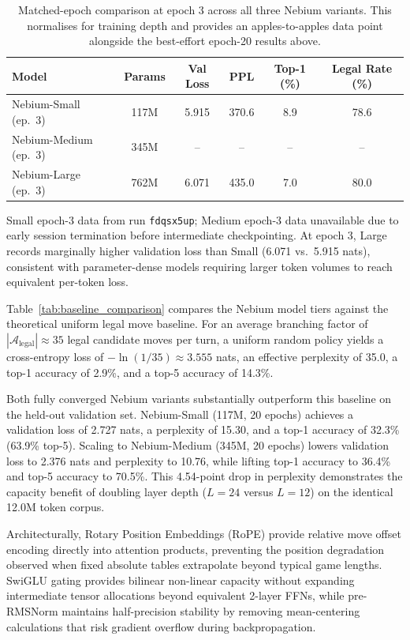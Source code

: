 \begin{table}[H]
\centering
\small
\caption[Matched-Epoch Comparison at Epoch 3]{Matched-epoch comparison at epoch 3 across all three Nebium variants. This normalises for training depth and provides an apples-to-apples data point alongside the best-effort epoch-20 results above.}
\label{tab:matched_epoch}
\begin{tabularx}{\linewidth}{>{\raggedright\arraybackslash}X c c c c c}
\toprule
\textbf{Model} & \textbf{Params} & \textbf{Val Loss} & \textbf{PPL} & \textbf{Top-1 (\%)} & \textbf{Legal Rate (\%)} \\
\midrule
Nebium-Small (ep.\ 3)  & 117M & 5.915 & 370.6 & 8.9  & 78.6 \\
Nebium-Medium (ep.\ 3) & 345M & --    & --    & --   & -- \\
Nebium-Large (ep.\ 3)  & 762M & 6.071 & 435.0 & 7.0  & 80.0 \\
\bottomrule
\end{tabularx}
\vspace{0.3em}
{\footnotesize Small epoch-3 data from run \texttt{fdqsx5up}; Medium epoch-3 data unavailable due to early session termination before intermediate checkpointing. At epoch 3, Large records marginally higher validation loss than Small (6.071 vs.\ 5.915 nats), consistent with parameter-dense models requiring larger token volumes to reach equivalent per-token loss.}
\end{table}

Table~\ref{tab:baseline_comparison} compares the Nebium model tiers against the theoretical uniform legal move baseline. For an average branching factor of $|\mathcal{A}_{\text{legal}}| \approx 35$ legal candidate moves per turn, a uniform random policy yields a cross-entropy loss of $-\ln(1/35) \approx 3.555$ nats, an effective perplexity of 35.0, a top-1 accuracy of 2.9\%, and a top-5 accuracy of 14.3\%.

Both fully converged Nebium variants substantially outperform this baseline on the held-out validation set. Nebium-Small (117M, 20 epochs) achieves a validation loss of 2.727 nats, a perplexity of 15.30, and a top-1 accuracy of 32.3\% (63.9\% top-5). Scaling to Nebium-Medium (345M, 20 epochs) lowers validation loss to 2.376 nats and perplexity to 10.76, while lifting top-1 accuracy to 36.4\% and top-5 accuracy to 70.5\%. This 4.54-point drop in perplexity demonstrates the capacity benefit of doubling layer depth ($L=24$ versus $L=12$) on the identical 12.0M token corpus.

Architecturally, Rotary Position Embeddings (RoPE) provide relative move offset encoding directly into attention products, preventing the position degradation observed when fixed absolute tables extrapolate beyond typical game lengths. SwiGLU gating provides bilinear non-linear capacity without expanding intermediate tensor allocations beyond equivalent 2-layer FFNs, while pre-RMSNorm maintains half-precision stability by removing mean-centering calculations that risk gradient overflow during backpropagation.

